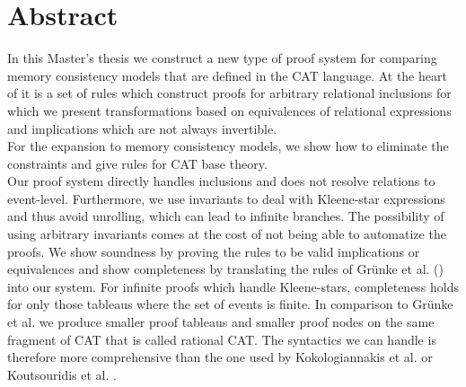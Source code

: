 \documentclass[a4paper,twoside,12pt, english]{article}
\newcommand{\emptypage}{\thispagestyle{empty}
\null
\vfill
\pagebreak
}
\begin{document}


\pagebreak
\emptypage

\emptypage

\thispagestyle{empty}
\section*{Abstract}
In this Master's thesis we construct a new type of proof system for comparing memory consistency models that are defined in the CAT language. At the heart of it is a set of rules which construct proofs for arbitrary relational inclusions for which we present transformations based on equivalences of relational expressions and implications which are not always invertible.\\
For the expansion to memory consistency models, we show how to eliminate the constraints and give rules for CAT base theory. \\
Our proof system directly handles inclusions and does not resolve relations to event-level. Furthermore, we use invariants to deal with Kleene-star expressions and thus avoid unrolling, which can lead to infinite branches. The possibility of using arbitrary invariants comes at the cost of not being able to automatize the proofs.
We show soundness by proving the rules to be valid implications or equivalences and show completeness by translating the rules of Grünke et al. (\cite{Gru+26}) into our system. For infinite proofs which handle Kleene-stars, completeness holds for only those tableaus where the set of events is finite.
In comparison to Grünke et al. we produce smaller proof tableaus and smaller proof nodes on the same fragment of CAT that is called rational CAT. The syntactics we can handle is therefore more comprehensive than the one used by Kokologiannakis et al. \cite{Kok+23} or Koutsouridis et al. \cite{Kou+24}.
\pagebreak

\emptypage

{
\thispagestyle{empty}
\hypersetup{linkcolor=black}
\tableofcontents
\thispagestyle{empty} %
}
\pagebreak
\vfill



\emptypage

\setcounter{page}{1}
\end{document}
